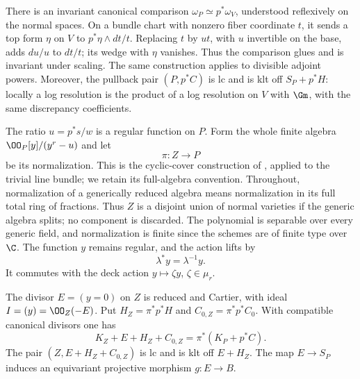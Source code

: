 There is an invariant canonical comparison
$\omega_P\simeq p^*\omega_V$, understood reflexively on the normal
spaces.  On a bundle chart with nonzero fiber coordinate $t$, it sends a
top form $\eta$ on $V$ to $p^*\eta\wedge dt/t$.  Replacing $t$ by
$ut$, with $u$ invertible on the base, adds $du/u$ to $dt/t$; its wedge
with $\eta$ vanishes.  Thus the comparison glues and is invariant under
scaling.  The same construction applies to divisible adjoint powers.
Moreover, the pullback pair $(P,p^*C)$ is lc and is klt off $S_P+p^*H$:
locally a log resolution is the product of a log resolution on $V$ with
$\Gm$, with the same discrepancy coefficients.

The ratio $u=p^*s/w$ is a regular function on $P$.  Form the whole finite
algebra $\OO_P[y]/(y^r-u)$ and let
\begin{equation}\label{bl:cov:first-cover}
 \pi:Z\longrightarrow P
\end{equation}
be its normalization. This is the cyclic-cover construction of
\cite[Section~3.5]{EsnaultViehweg1992}, applied to the trivial line
bundle; we retain its full-algebra convention. Throughout, normalization of a generically
reduced algebra means normalization in its full total ring of fractions.
Thus $Z$ is a disjoint union of normal varieties if the generic algebra
splits; no component is discarded.  The polynomial is separable over
every generic field, and normalization is finite since the schemes are
of finite type over $\C$.  The function $y$ remains regular, and the
action lifts by
\[
 \lambda^*y=\lambda^{-1}y.
\]
It commutes with the deck action $y\mapsto\zeta y$, $\zeta\in\mu_r$.

\begin{lemma}\label{bl:cov:reduced-cover}
The divisor $E=(y=0)$ on $Z$ is reduced and Cartier, with ideal
$I=(y)=\OO_Z(-E)$.  Put
$H_Z=\pi^*p^*H$ and $C_{0,Z}=\pi^*p^*C_0$.  With compatible canonical
divisors one has
\begin{equation}\label{bl:cov:crepant}
 K_Z+E+H_Z+C_{0,Z}=\pi^*(K_P+p^*C).
\end{equation}
The pair $(Z,E+H_Z+C_{0,Z})$ is lc and is klt off $E+H_Z$.
The map $E\to S_P$ induces an equivariant projective morphism
$g:E\to B$.
\end{lemma}

